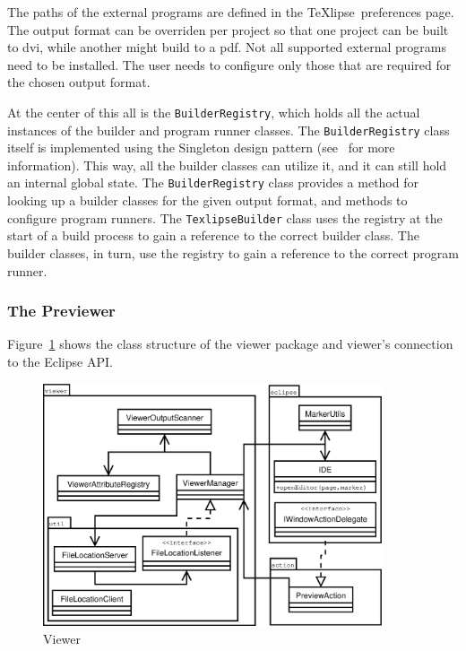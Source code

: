 \documentclass[a4paper,11pt,twoside]{article}
\newcommand{\texlipse}{\TeX lipse}
\begin{document}
The paths of the external programs are defined in the \texlipse\ preferences 
page. The output format can be overriden per project so that one project can be 
built to dvi, while another might build to a pdf. Not all supported external 
programs need to be installed. The user needs to configure only those that are 
required for the chosen output format.

At the center of this all is the \texttt{BuilderRegistry}, which holds all the 
actual instances of the builder and program runner classes. The 
\texttt{BuilderRegistry} class itself is implemented using the Singleton design 
pattern (see~\cite{GHJV:despatterns95} for more information). This way, all the 
builder classes can utilize it, and it can still hold an internal global state. 
The \texttt{BuilderRegistry} class provides a method for looking up a builder 
classes for the given output format, and methods to configure program runners. 
The \texttt{TexlipseBuilder} class uses the registry at the start of a build 
process to gain a reference to the correct builder class. The builder classes, 
in turn, use the registry to gain a reference to the correct program runner.


\subsubsection{The Previewer}

Figure~\ref{fig:viewer} shows the class structure of the viewer package and 
viewer's connection to the Eclipse API.

\begin{figure}[!htp]
\begin{center}
\includegraphics[width=10cm]{images/viewer}
\caption{Viewer}
\label{fig:viewer}
\end{center}
\end{figure}
\end{document}
